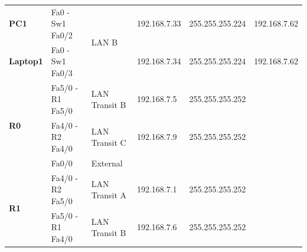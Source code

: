 \documentclass[11pt,a4paper]{report}
\begin{document}
\begin{center}
\begin{longtable}{@{}llllll@{}}
                \textbf{PC1}                                       & Fa0 - Sw1 Fa0/2                                          & \multirow{2}{*}{LAN B}                                & 192.168.7.33                                     & 255.255.255.224                                           & 192.168.7.62                                          \\
                \textbf{Laptop1}                                   & Fa0 - Sw1 Fa0/3                                          &                                                       & 192.168.7.34                                     & 255.255.255.224                                           & 192.168.7.62                                          \\* \midrule
                \multirow{3}{*}{\textbf{R0}}                       & Fa5/0 - R1 Fa5/0                                         & LAN Transit B                                         & 192.168.7.5                                      & 255.255.255.252                                           &                                                       \\
                                                                   & Fa4/0 - R2 Fa4/0                                         & LAN Transit C                                         & 192.168.7.9                                      & 255.255.255.252                                           &                                                       \\
                                                                   & Fa0/0                                                    & External                                              &                                                  &                                                           &                                                       \\* \midrule
                \multirow{4}{*}{\textbf{R1}}                       & Fa4/0 - R2 Fa5/0                                         & LAN Transit A                                         & 192.168.7.1                                      & 255.255.255.252                                           &                                                       \\
                                                                   & Fa5/0 - R1 Fa4/0                                         & LAN Transit B                                         & 192.168.7.6                                      & 255.255.255.252                                           &                                                       \\

\end{longtable}
\end{center}
\end{document}
